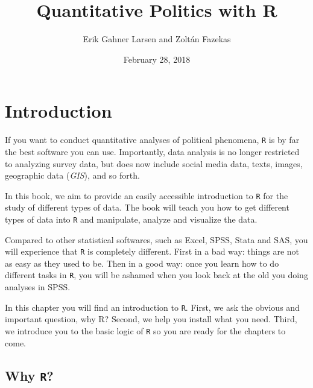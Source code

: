 \documentclass[12pt,oneside]{reedthesis}
\title{\Huge{ Quantitative Politics with R } \vspace{2em}}
\author{Erik Gahner Larsen and Zoltán Fazekas}
\date{February 28, 2018}
\theoremstyle{definition}
\theoremstyle{definition}
\theoremstyle{definition}
\theoremstyle{remark}
\begin{document}
      \maketitle
  
  \frontmatter %
  \pagestyle{empty} %

  
  
      \hypersetup{linkcolor=black}
    \setcounter{tocdepth}{2}
    \tableofcontents
  
  
  
  
  
  \mainmatter %
  \pagestyle{fancyplain} %

  \chapter{Introduction}\label{introduction}
  
  If you want to conduct quantitative analyses of political phenomena,
  \texttt{R} is by far the best software you can use. Importantly, data
  analysis is no longer restricted to analyzing survey data, but does now
  include social media data, texts, images, geographic data (\emph{GIS}),
  and so forth.
  
  In this book, we aim to provide an easily accessible introduction to
  \texttt{R} for the study of different types of data. The book will teach
  you how to get different types of data into \texttt{R} and manipulate,
  analyze and visualize the data.
  
  Compared to other statistical softwares, such as Excel, SPSS, Stata and
  SAS, you will experience that \texttt{R} is completely different. First
  in a bad way: things are not as easy as they used to be. Then in a good
  way: once you learn how to do different tasks in \texttt{R}, you will be
  ashamed when you look back at the old you doing analyses in SPSS.
  
  In this chapter you will find an introduction to \texttt{R}. First, we
  ask the obvious and important question, why R? Second, we help you
  install what you need. Third, we introduce you to the basic logic of
  \texttt{R} so you are ready for the chapters to come.
  
  \section{\texorpdfstring{Why \texttt{R}?}{Why R?}}\label{why-r}
  
\end{document}
